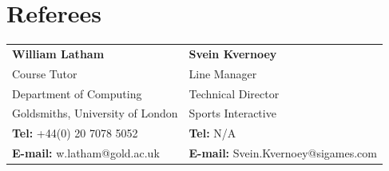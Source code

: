\documentclass{article}
\begin{document}
\vspace{-3mm}
\section*{Referees}
\vspace{-3mm}
\begin{tabular}{ p{} p{}}
	\textbf{William Latham} 						& 	\textbf{Svein Kvernoey} \\
	Course Tutor 							& 	Line Manager \\
	Department of Computing						&	Technical Director \\
	Goldsmiths, University of London					&	Sports Interactive \\
	
	\textbf{Tel:}	+44(0) 20 7078 5052				&	\textbf{Tel:} N/A \\
	\textbf{E-mail:} w.latham@gold.ac.uk				& 	\textbf{E-mail:} Svein.Kvernoey@sigames.com \\
\end{tabular}
\end{document}
